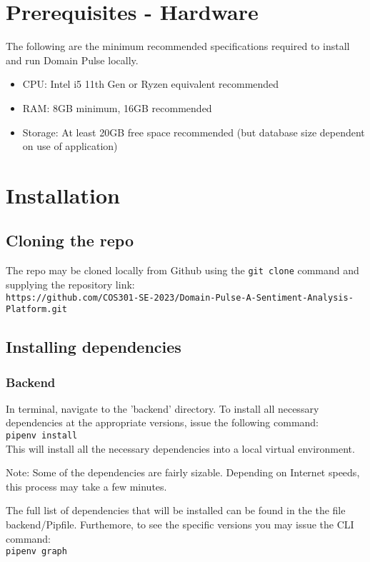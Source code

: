 \documentclass[12pt]{article}
\begin{document}
\section{Prerequisites - Hardware}
The following are the minimum recommended specifications required to install and run Domain Pulse locally.
\begin{itemize}
    \item CPU: Intel i5 11th Gen or Ryzen equivalent recommended
    \item RAM: 8GB minimum, 16GB recommended
    \item Storage: At least 20GB free space recommended (but database size dependent on use of application)
\end{itemize}


\section{Installation}

\subsection{Cloning the repo}
The repo may be cloned locally from Github using the \texttt{git clone} command and supplying the repository link:\\
\texttt{https://github.com/COS301-SE-2023/Domain-Pulse-A-Sentiment-Analysis-Platform.git}



\subsection{Installing dependencies}
\subsubsection{Backend}
In terminal, navigate to the 'backend' directory. To install all necessary dependencies at the appropriate versions, issue the following
command: \\
\texttt{pipenv install}\\
This will install all the necessary dependencies into a local virtual environment.

Note: Some of the dependencies are fairly sizable. Depending on Internet speeds, this process may take a few minutes.

The full list of dependencies that will be installed can be found in the the file backend/Pipfile. Furthemore, to see the specific versions you may issue the CLI command:\\
\texttt{pipenv graph} 
\end{document}
